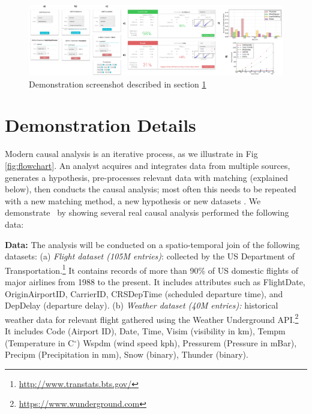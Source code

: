 \begin{figure}
\centering
\includegraphics[scale=0.13]{Figures/Demo-Tutorial-2.png}
\caption{Demonstration screenshot described in section \ref{sec:dd}}
\label{sfig:demo-tutorial}
\end{figure}


\section{Demonstration Details}
\label{sec:dd}
Modern causal analysis is an iterative process, as we illustrate in Fig \ref{fig:flowchart}.
An analyst acquires and integrates data from multiple sources, generates a hypothesis, pre-processes  relevant data with matching (explained below),
  then conducts the causal analysis; most often this needs to be repeated with a new matching
  method, a new hypothesis or  new datasets \cite{IacKinPor09}.
We demonstrate \GSQL\ by showing several real causal analysis performed the following data: 


    {\bf Data:} The analysis will be conducted on a spatio-temporal join of the following datasets:
(a) {\it Flight dataset (105M entries)}: collected by the US
Department of Transportation.\footnote{\url{http://www.transtats.bts.gov/}} It contains
records of more than 90\% of US domestic flights of major airlines
from 1988 to the present. It includes attributes such as FlightDate, OriginAirportID,
CarrierID, CRSDepTime (scheduled departure time), and DepDelay (departure delay).
(b) {\it Weather dataset (40M entries):} historical weather data for relevant flight gathered using the Weather Underground API.\footnote{\url{https://www.wunderground.com}} It includes Code (Airport ID),
Date, Time,  Visim (visibility in km),
  Tempm (Temperature in C$^{\circ}$)
  Wspdm (wind speed kph), Pressurem (Pressure in mBar), Precipm  (Precipitation in mm), Snow (binary), Thunder (binary).






